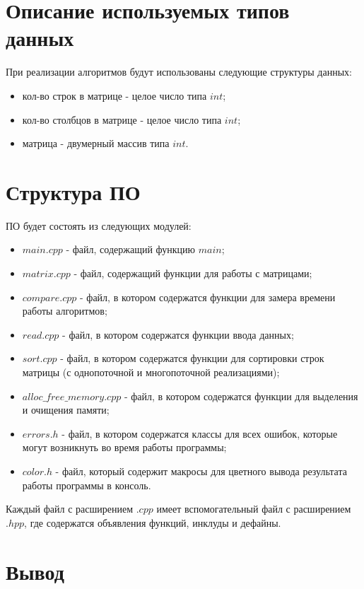 \documentclass[a4paper,14pt, unknownkeysallowed]{extreport}
\begin{document}
\section{Описание используемых типов данных}

При реализации алгоритмов будут использованы следующие структуры данных:

\begin{itemize}
	\item кол-во строк в матрице - целое число типа $int$;
	\item кол-во столбцов в матрице - целое число типа $int$;
	\item матрица - двумерный массив типа $int$.
\end{itemize}

\clearpage

\section{Структура ПО}

ПО будет состоять из следующих модулей:

\begin{itemize}
	\item $main.cpp$ - файл, содержащий функцию $main$;
    \item $matrix.cpp$ - файл, содержащий функции для работы с матрицами;
    \item $compare.cpp$ - файл, в котором содержатся функции для замера времени работы алгоритмов;
    \item $read.cpp$ - файл, в котором содержатся функции ввода данных;
    \item $sort.cpp$ - файл, в котором содержатся функции для сортировки строк матрицы (с однопоточной и многопоточной реализациями);
    \item $alloc\_free\_memory.cpp$ - файл, в котором содержатся функции для выделения и очищения памяти;
    \item $errors.h$ - файл, в котором содержатся классы для всех ошибок, которые могут возникнуть во время работы программы;
    \item $color.h$ - файл, который содержит макросы для цветного вывода результата работы программы в консоль.
\end{itemize}

Каждый файл с расширением $.cpp$ имеет вспомогательный файл с расширением $.hpp$, где содержатся объявления функций, инклуды и дефайны.

\section{Вывод}
\end{document}

